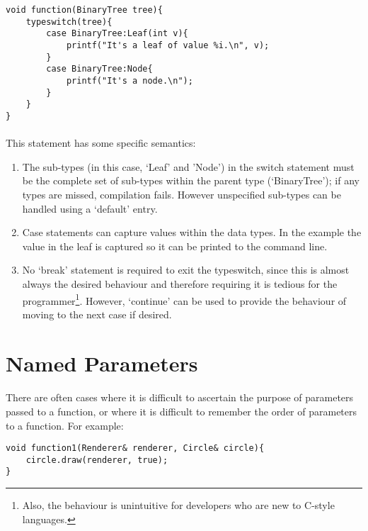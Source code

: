 \documentclass[12pt,twoside,notitlepage]{report}
\begin{document}
\small{
\begin{verbatim}
void function(BinaryTree tree){
    typeswitch(tree){
        case BinaryTree:Leaf(int v){
            printf("It's a leaf of value %i.\n", v);
        }
        case BinaryTree:Node{
            printf("It's a node.\n");
        }
    }
}
\end{verbatim}
}

\paragraph{}
This statement has some specific semantics:

\begin{enumerate}
\item The sub-types (in this case, `Leaf' and 'Node') in the switch statement must be the complete set of sub-types within the parent type (`BinaryTree'); if any types are missed, compilation fails. However unspecified sub-types can be handled using a `default' entry.
\item Case statements can capture values within the data types. In the example the value in the leaf is captured so it can be printed to the command line.
\item No `break' statement is required to exit the typeswitch, since this is almost always the desired behaviour and therefore requiring it is tedious for the programmer\footnote{Also, the behaviour is unintuitive for developers who are new to C-style languages.}. However, `continue' can be used to provide the behaviour of moving to the next case if desired.
\end{enumerate}

\section{Named Parameters}

\paragraph{}
There are often cases where it is difficult to ascertain the purpose of parameters passed to a function, or where it is difficult to remember the order of parameters to a function. For example:

\small{
\begin{verbatim}
void function1(Renderer& renderer, Circle& circle){
    circle.draw(renderer, true);
}
\end{verbatim}
}
\end{document}
